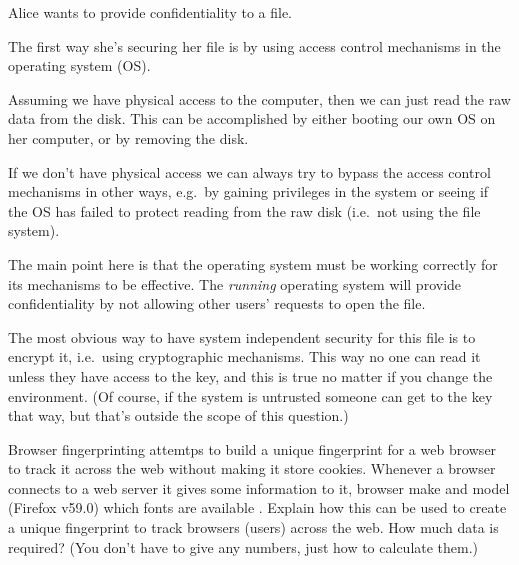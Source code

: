 \question[3]
  Alice wants to provide confidentiality to a file.

  \begin{solution}
    The first way she's securing her file is by using access control mechanisms 
    in the operating system (OS).

    Assuming we have physical access to the computer, then we can just read the 
    raw data from the disk.
    This can be accomplished by either booting our own OS on her computer, or 
    by removing the disk.

    If we don't have physical access we can always try to bypass the access 
    control mechanisms in other ways, e.g.\ by gaining privileges in the system 
    or seeing if the OS has failed to protect reading from the raw disk (i.e.\ 
    not using the file system).

    The main point here is that the operating system must be working correctly 
    for its mechanisms to be effective.
    The \emph{running} operating system will provide confidentiality by not 
    allowing other users' requests to open the file.

    The most obvious way to have system independent security for this file is 
    to encrypt it, i.e.~using cryptographic mechanisms.
    This way no one can read it unless they have access to the key, and this is 
    true no matter if you change the environment.
    (Of course, if the system is untrusted someone can get to the key that way, 
    but that's outside the scope of this question.)
  \end{solution}


  
\question[3]
Browser fingerprinting attemtps to build a unique fingerprint for a web browser 
to track it across the web without making it store cookies.
Whenever a browser connects to a web server it gives some information to it, 
\eg browser make and model (\eg Firefox v59.0) which fonts are available \etc.
Explain how this can be used to create a unique fingerprint to track browsers 
(\ie users) across the web.
How much data is required?
(You don't have to give any numbers, just how to calculate them.)

